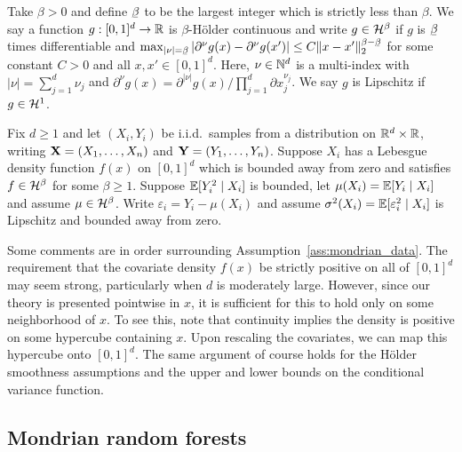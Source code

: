 \begin{definition}%

  Take $\beta > 0$ and define
  $\flbeta$ to be the largest integer which is strictly less than $\beta$.
  We say a function $g: [0,1]^d \to \mathbb{R}$
  is $\beta$-H{\"o}lder continuous and
  write $g \in \mathcal{H}^\beta$ if
  $g$ is $\flbeta$ times differentiable and
  $\max_{|\nu| = \flbeta}
  \left| \partial^\nu g(x) - \partial^{\nu} g(x') \right|
  \leq C \|x-x'\|_2^{\beta - \flbeta}$
  for some constant $C > 0$
  and all $x, x' \in [0,1]^d$.
  Here, $\nu \in \mathbb{N}^d$ is a multi-index with
  $|\nu| = \sum_{j=1}^d \nu_j$ and
  $\partial^{\nu} g(x) =
  \partial^{|\nu|} g(x) \big/ \prod_{j=1}^d \partial x_j^{\nu_j}$.
  We say $g$ is Lipschitz if $g \in \mathcal{H}^1$.

\end{definition}

\begin{assumption}%
  \label{ass:mondrian_data}

  Fix $d \geq 1$ and
  let $(X_i, Y_i)$ be i.i.d.\ samples from a distribution
  on $\mathbb{R}^d \times \mathbb{R}$,
  writing $\mathbf{X} = (X_1, \ldots, X_n)$
  and $\mathbf{Y} = (Y_1, \ldots, Y_n)$.
  Suppose $X_i$ has a Lebesgue density function $f(x)$
  on $[0,1]^d$ which is bounded away from zero
  and satisfies $f \in \mathcal{H}^\beta$ for some $\beta \geq 1$.
  Suppose $\mathbb{E}[Y_i^2 \mid X_i]$ is bounded,
  let $\mu(X_i) = \mathbb{E}[Y_i \mid X_i]$
  and assume $\mu \in \mathcal{H}^\beta$.
  Write $\varepsilon_i = Y_i - \mu(X_i)$ and assume
  $\sigma^2(X_i) = \mathbb{E}[\varepsilon_i^2 \mid X_i]$ is Lipschitz
  and bounded away from zero.

\end{assumption}

Some comments are in order surrounding Assumption~\ref{ass:mondrian_data}.
The requirement that the covariate density $f(x)$
be strictly positive on all of $[0,1]^d$ may seem strong,
particularly when $d$ is moderately large.
However, since our theory is presented pointwise in $x$,
it is sufficient for this to hold only on some neighborhood of $x$.
To see this, note that continuity implies the density
is positive on some hypercube containing $x$. Upon rescaling
the covariates, we can map this hypercube onto $[0,1]^d$.
The same argument of course holds for the H{\"o}lder smoothness
assumptions and the upper and lower bounds on the conditional variance
function.

\subsection{Mondrian random forests}

